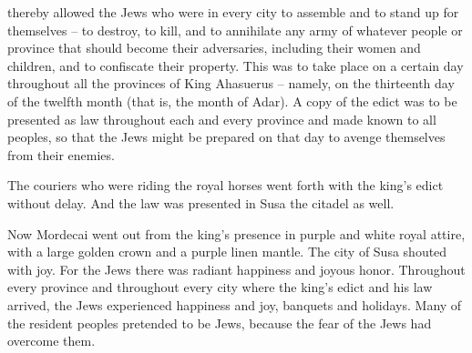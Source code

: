 {thereby allowed
the Jews
who were in
every
city
to assemble
and to stand up
for
themselves
– to destroy,
to kill,
and to annihilate
any
army
of whatever people
or province
that should become their adversaries,
including their women
and children,
and to confiscate their property.
This
was to take place on a certain
day
throughout all
the provinces
of King
Ahasuerus
– namely, on the thirteenth
day of the twelfth
month
(that is,
the month
of Adar).
A copy
of the edict
was to be presented
as law
throughout each
and every
province
and made known
to all
peoples,
so that the Jews
might be prepared
on that day
to avenge
themselves from their enemies.
\par }{\PP {}The couriers
who were riding
the royal horses
went forth
with the king’s
edict
without delay.
And the law
was presented
in Susa
the citadel as well.
\par }{\PP {}Now Mordecai
went out
from the king’s
presence
in purple
and white
royal
attire,
with a large
golden
crown
and a purple
linen
mantle.
The city
of Susa
shouted
with joy.
For the Jews
there was
radiant
happiness
and joyous
honor.
Throughout every
province
and throughout every
city
where
the king’s
edict
and his law
arrived,
the Jews
experienced happiness
and joy,
banquets
and holidays. Many
of the resident peoples
pretended to be Jews,
because
the fear
of the Jews
had overcome
them.

}
